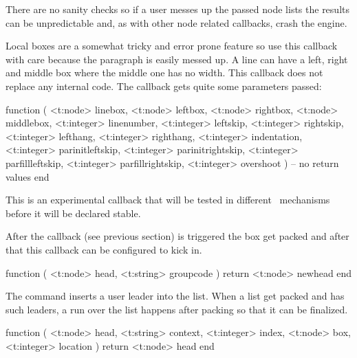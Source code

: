 There are no sanity checks so if a user messes up the passed node lists the results
can be unpredictable and, as with other node related callbacks, crash the engine.

\stopsubsection

\startsubsection[title=local_box_filter]

Local boxes are a somewhat tricky and error prone feature so use this callback
with care because the paragraph is easily messed up. A line can have a left,
right and middle box where the middle one has no width. This callback does not
replace any internal code. The callback gets quite some parameters passed:

\starttyping[option=LUA]
function (
    <t:node>    linebox,
    <t:node>    leftbox,
    <t:node>    rightbox,
    <t:node>    middlebox,
    <t:integer> linenumber,
    <t:integer> leftskip,
    <t:integer> rightskip,
    <t:integer> lefthang,
    <t:integer> righthang,
    <t:integer> indentation,
    <t:integer> parinitleftskip,
    <t:integer> parinitrightskip,
    <t:integer> parfillleftskip,
    <t:integer> parfillrightskip,
    <t:integer> overshoot
)
    -- no return values
end
\stoptyping

This is an experimental callback that will be tested in different \CONTEXT\
mechanisms before it will be declared stable.

\stopsubsection

\startsubsection[title=packed_vbox_filter]

After the  callback (see previous section) is triggered the
box get packed and after that this callback can be configured to kick in.

\starttyping[option=LUA]
function (
    <t:node>   head,
    <t:string> groupcode
)
    return <t:node> newhead
end
\stoptyping

\stopsubsection

\startsubsection[title=handle_uleader]

The \typ {\uleaders} command inserts a user leader into the list. When a list get packed
and has such leaders, a run over the list happens after packing so that it can be
finalized.

\starttyping[option=LUA]
function (
    <t:node>    head,
    <t:string>  context,
    <t:integer> index,
    <t:node>    box,
    <t:integer> location
)
    return <t:node> head
end
\stoptyping

\stopsubsection

\startsubsection[title=italic_correction]


